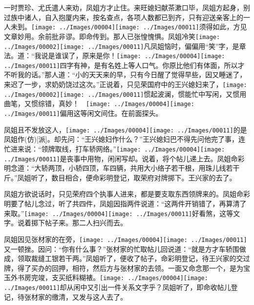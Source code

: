 一时贾珍、尤氏遣人来劝，凤姐方才止住。来旺媳妇献茶漱口毕，凤姐方起身，别过族中诸人，自入抱厦内来，按名查点，各项人数都已到齐，只有迎送亲客上的一人未到。{\texttt{[image: ../Images/00004]}\texttt{[image: ../Images/00011]}\footnotesize \kaishu 须得如此，方见文章妙用。余前批非谬。}即命传到。那人已张惶愧惧。凤姐冷笑{\texttt{[image: ../Images/00002]}\texttt{[image: ../Images/00011]}\footnotesize \kaishu 凡凤姐恼时，偏偏用``笑''字，是章法。}道：``我说是谁误了，原来是你！{\texttt{[image: ../Images/00004]}\texttt{[image: ../Images/00011]}\footnotesize \kaishu 四字有神，是有名姓上等人口气。}你原比他们有体面，所以才不听我的话。''那人道：``小的天天来的早，只有今日醒了觉得早些，因又睡迷了，来迟了一步，求奶奶饶过这次。''正说着，只见荣国府中的王兴媳妇来了，{\texttt{[image: ../Images/00002]}\texttt{[image: ../Images/00011]}\footnotesize \kaishu 惯起波澜，惯能忙中写闲，又惯用曲笔，又惯综错，真妙！　\texttt{[image: ../Images/00004]}\texttt{[image: ../Images/00011]}\footnotesize \kaishu 偏用这等闲文间住。}在前面探头。

凤姐且不发放这人，{{\texttt{[image: ../Images/00004]}\texttt{[image: ../Images/00011]}\footnotesize \kaishu 的是凤姐作{(仿)}{[}派{]}。}}却先问：``王兴媳妇作什么？''王兴媳妇巴不得先问他完了事，连忙进来说：``领牌取线，打车轿网络。''{\texttt{[image: ../Images/00004]}\texttt{[image: ../Images/00011]}\footnotesize \kaishu 是丧事中用物，闲闲写却。}说着，将个帖儿递上去。凤姐命彩明念道：``大轿两顶，小轿四顶，车四辆，共用大小络子若干根，用珠儿线若干斤。''凤姐听了，数目相合，便命彩明登记，取荣府对牌掷下。王兴家的去了。

凤姐方欲说话时，只见荣府四个执事人进来，都是要支取东西领牌来的。凤姐命彩明要了帖儿念过，听了共四件，凤姐因指两件说道：``这两件开销错了，再算清了来取。''{\texttt{[image: ../Images/00004]}\texttt{[image: ../Images/00011]}\footnotesize \kaishu 好看煞，这等文字。}说着掷下帖子来。那二人扫兴而去。

凤姐因见张材家的在旁，{\texttt{[image: ../Images/00004]}\texttt{[image: ../Images/00011]}\footnotesize \kaishu 又一顿挫。}因问：``你有什么事？''张材家的忙取帖儿回说道：``就是方才车轿围做成，领取裁缝工银若干两。''凤姐听了，便收了帖子，命彩明登记，待王兴家的交过牌，得了买办的回押，相符，然后方与张材家的去领。一面又命念那一个，是为宝玉外书房完竣，支买纸料糊裱。{\texttt{[image: ../Images/00004]}\texttt{[image: ../Images/00011]}\footnotesize \kaishu 却从闲中又引出一件关系文字乎？}凤姐听了，即命收帖儿登记，待张材家的缴清，又发与这人去了。

